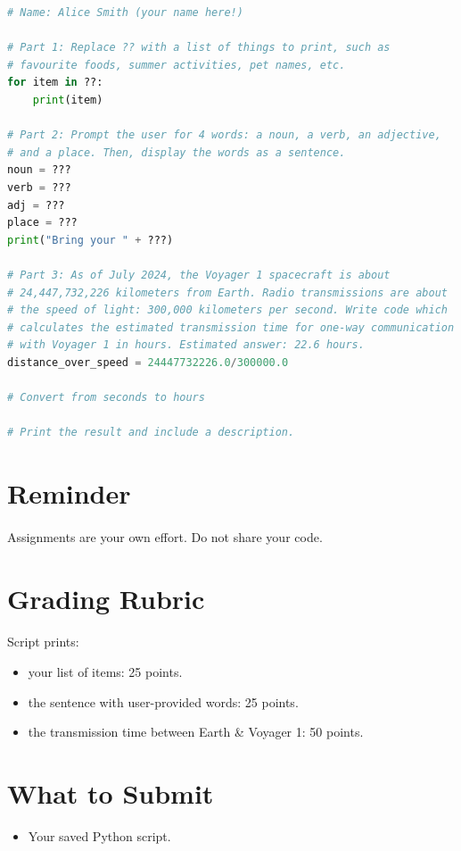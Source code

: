 \documentclass[letter,10pt]{article}
\begin{document}
    \begin{lstlisting}[language=python]
# Name: Alice Smith (your name here!)

# Part 1: Replace ?? with a list of things to print, such as
# favourite foods, summer activities, pet names, etc.
for item in ??:
    print(item)

# Part 2: Prompt the user for 4 words: a noun, a verb, an adjective,
# and a place. Then, display the words as a sentence.
noun = ???
verb = ???
adj = ???
place = ???
print("Bring your " + ???)

# Part 3: As of July 2024, the Voyager 1 spacecraft is about
# 24,447,732,226 kilometers from Earth. Radio transmissions are about
# the speed of light: 300,000 kilometers per second. Write code which
# calculates the estimated transmission time for one-way communication
# with Voyager 1 in hours. Estimated answer: 22.6 hours.
distance_over_speed = 24447732226.0/300000.0

# Convert from seconds to hours

# Print the result and include a description.

    \end{lstlisting}
    
    \section*{Reminder}
    \paragraph{}Assignments are your own effort. Do not share your code.
    
    \section*{Grading Rubric}
    \paragraph{}Script prints:
    \begin{itemize}
        \item your list of items: 25 points.
        \item the sentence with user-provided words: 25 points.
        \item the transmission time between Earth \& Voyager 1: 50 points.
    \end{itemize}
    
    \section*{What to Submit}
    \begin{itemize}
        \item Your saved Python script.
    \end{itemize}
    
\end{document}
